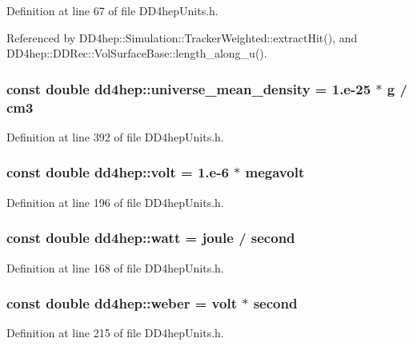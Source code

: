 Definition at line 67 of file DD4hepUnits.h.

Referenced by DD4hep::Simulation::TrackerWeighted::extractHit(), and DD4hep::DDRec::VolSurfaceBase::length\_\-along\_\-u().\hypertarget{namespacedd4hep_a139a30c8403dfa4a6294daf563d735dd}{
\subsubsection[{universe\_\-mean\_\-density}]{\setlength{\rightskip}{0pt plus 5cm}const double {\bf dd4hep::universe\_\-mean\_\-density} = 1.e-\/25 $\ast$ {\bf g} / {\bf cm3}}}
\label{namespacedd4hep_a139a30c8403dfa4a6294daf563d735dd}


Definition at line 392 of file DD4hepUnits.h.\hypertarget{namespacedd4hep_a1bbac6ed4a69b41427c9a44a513e2500}{
\subsubsection[{volt}]{\setlength{\rightskip}{0pt plus 5cm}const double {\bf dd4hep::volt} = 1.e-\/6 $\ast$ {\bf megavolt}}}
\label{namespacedd4hep_a1bbac6ed4a69b41427c9a44a513e2500}


Definition at line 196 of file DD4hepUnits.h.\hypertarget{namespacedd4hep_ac7c4e7152ccb61b9950932bb06c7c4cd}{
\subsubsection[{watt}]{\setlength{\rightskip}{0pt plus 5cm}const double {\bf dd4hep::watt} = {\bf joule} / {\bf second}}}
\label{namespacedd4hep_ac7c4e7152ccb61b9950932bb06c7c4cd}


Definition at line 168 of file DD4hepUnits.h.\hypertarget{namespacedd4hep_abf1c21ae96759cd276d59ddde4819838}{
\subsubsection[{weber}]{\setlength{\rightskip}{0pt plus 5cm}const double {\bf dd4hep::weber} = {\bf volt} $\ast$ {\bf second}}}
\label{namespacedd4hep_abf1c21ae96759cd276d59ddde4819838}


Definition at line 215 of file DD4hepUnits.h.